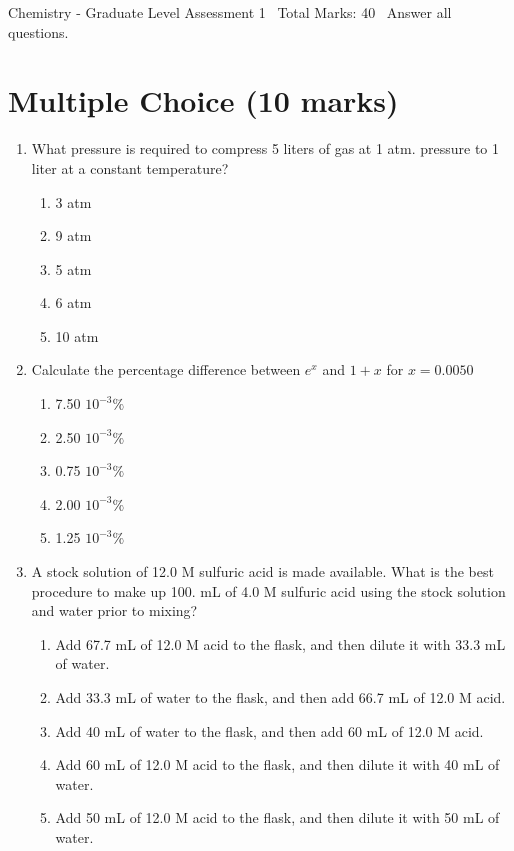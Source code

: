 \documentclass[12pt]{article}
\begin{document}
\begin{center}
Chemistry - Graduate Level Assessment 1 \
Total Marks: 40 \
Answer all questions.
\end{center}

\section*{Multiple Choice (10 marks)}
\begin{enumerate}[label=\arabic*.]
\item What pressure is required to compress 5 liters of gas at 1 atm. pressure to 1 liter at a constant temperature?
\begin{enumerate}[label=(\alph*)]
    \item 3 atm
    \item 9 atm
    \item 5 atm
    \item 6 atm
    \item 10 atm
\end{enumerate}
\item Calculate the percentage difference between $e^x$ and $1+x$ for $x=0.0050$
\begin{enumerate}[label=(\alph*)]
    \item 7.50 $10^{-3} \%$
    \item 2.50 $10^{-3} \%$
    \item 0.75 $10^{-3} \%$
    \item 2.00 $10^{-3} \%$
    \item 1.25 $10^{-3} \%$
\end{enumerate}
\item A stock solution of 12.0 M sulfuric acid is made available. What is the best procedure to make up 100. mL of 4.0 M sulfuric acid using the stock solution and water prior to mixing?
\begin{enumerate}[label=(\alph*)]
    \item Add 67.7 mL of 12.0 M acid to the flask, and then dilute it with 33.3 mL of water.
    \item Add 33.3 mL of water to the flask, and then add 66.7 mL of 12.0 M acid.
    \item Add 40 mL of water to the flask, and then add 60 mL of 12.0 M acid.
    \item Add 60 mL of 12.0 M acid to the flask, and then dilute it with 40 mL of water.
    \item Add 50 mL of 12.0 M acid to the flask, and then dilute it with 50 mL of water.
\end{enumerate}

\end{enumerate}
\end{document}
